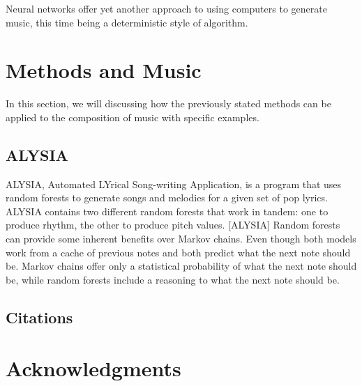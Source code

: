 \documentclass{sig-alternate}
\begin{document}
	Neural networks offer yet another approach to using computers to generate music, this time being a deterministic style of algorithm. 

\section{Methods and Music}
	In this section, we will discussing how the previously stated methods can be applied to the composition of music with specific examples.

\subsection{ALYSIA}
\label{sec:ALYSIA}
	ALYSIA, Automated LYrical Song-writing Application, is a program that uses random forests to generate songs and melodies for a given set of pop lyrics. ALYSIA contains two different random forests that work in tandem: one to produce rhythm, the other to produce pitch values. [ALYSIA] Random forests can provide some inherent benefits over Markov chains. Even though both models work from a cache of previous notes and both predict what the next note should be. Markov chains offer only a statistical probability of what the next note should be, while random forests include a reasoning to what the next note should be. 


\label{sec:methodsandmusic}
\subsection{Citations}
\label{sec:citations}

\subsection{}
\label{sec:theoremLikeConstructs}


\subsection*{}
\label{sec:caveatForExperts}



\section*{Acknowledgments}
\label{sec:acknowledgments}



  
\end{document}
